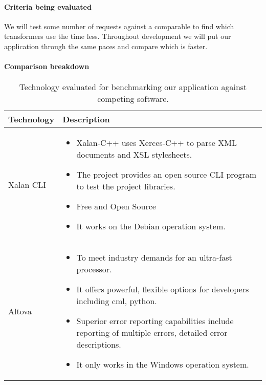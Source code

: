 \paragraph{Criteria being evaluated}

We will test some number of requests against a comparable to find which transformers use the time less.
Throughout development we will put our application through the same paces and compare which is faster.

\paragraph{Comparison breakdown}

\begin{table}[H]
  \begin{center}
    \begin{tabular}{ | l | p{10cm} |}
      \hline
      Technology & Description  \\ \hline

      Xalan CLI \cite{Xalan-C} &
      \begin{itemize}
        \item Xalan-C++ uses Xerces-C++ to parse XML documents and XSL stylesheets.
        \item The project provides an open source CLI program to test the project libraries.
        \item Free and Open Source
        \item It works on the Debian operation system. 
      \end{itemize}\\ \hline

      Altova \cite{Altova} &
      \begin{itemize}
        \item To meet industry demands for an ultra-fast processor.
        \item It offers powerful, flexible options for developers including cml, python.
        \item Superior error reporting capabilities include reporting of multiple errors, detailed error descriptions.
        \item It only works in the Windows operation system. 
      \end{itemize} \\ \hline
    \end{tabular}
  \end{center}
  \caption{Technology evaluated for benchmarking our application against competing software.}
\end{table}

